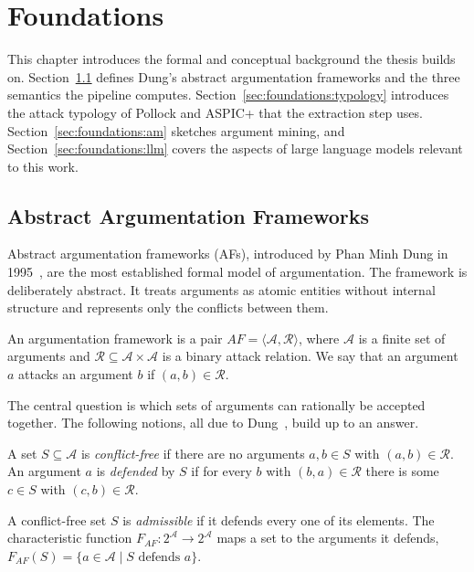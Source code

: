 %
\chapter{Foundations}
\label{sec:foundations}

This chapter introduces the formal and conceptual background the thesis builds
on. Section~\ref{sec:foundations:aaf} defines Dung's abstract argumentation
frameworks and the three semantics the pipeline computes.
Section~\ref{sec:foundations:typology} introduces the attack typology of Pollock
and ASPIC+ that the extraction step uses. Section~\ref{sec:foundations:am}
sketches argument mining, and Section~\ref{sec:foundations:llm} covers the
aspects of large language models relevant to this work.

\section{Abstract Argumentation Frameworks}
\label{sec:foundations:aaf}

Abstract argumentation frameworks (AFs), introduced by Phan Minh
Dung in 1995~\cite{dung1995}, are the most established formal model of
argumentation. The framework is deliberately abstract. It treats arguments as
atomic entities without internal structure and represents only the conflicts
between them.

\begin{definition}
An argumentation framework is a pair $AF = \langle \mathcal{A}, \mathcal{R}
\rangle$, where $\mathcal{A}$ is a finite set of arguments and $\mathcal{R}
\subseteq \mathcal{A} \times \mathcal{A}$ is a binary attack relation. We say
that an argument $a$ attacks an argument $b$ if $(a,b) \in \mathcal{R}$.
\end{definition}

The central question is which sets of arguments can rationally be accepted
together. The following notions, all due to Dung~\cite{dung1995}, build up to
an answer.

\begin{definition}
A set $S \subseteq \mathcal{A}$ is \emph{conflict-free} if there are no
arguments $a, b \in S$ with $(a, b) \in \mathcal{R}$. An argument $a$ is
\emph{defended} by $S$ if for every $b$ with $(b, a) \in \mathcal{R}$ there is
some $c \in S$ with $(c, b) \in \mathcal{R}$.
\end{definition}

\begin{definition}
A conflict-free set $S$ is \emph{admissible} if it defends every one of its
elements. The characteristic function $F_{AF} : 2^{\mathcal{A}} \to
2^{\mathcal{A}}$ maps a set to the arguments it defends,
$F_{AF}(S) = \{ a \in \mathcal{A} \mid S \text{ defends } a \}$.
\end{definition}

